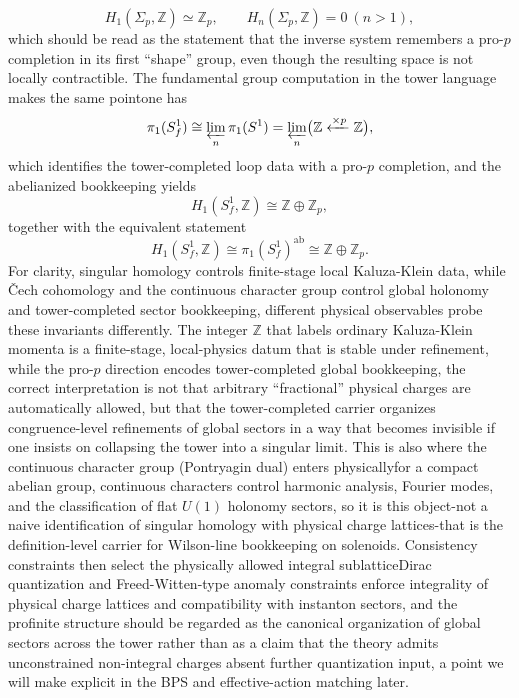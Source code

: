 \documentclass[11pt]{article}
\theoremstyle{remark}
\newcommand{\Z}{\mathbb{Z}}
\begin{document}
\begin{equation}\label{24}
H_1(\Sigma_p,\Z)\simeq \Z_p,\qquad H_n(\Sigma_p,\Z)=0\ (n>1),
\end{equation}
which should be read as the statement that the inverse system remembers a pro-\(p\) completion in its first ``shape'' group, even though the resulting space is not locally contractible. The fundamental group computation in the tower language makes the same point\:one has
\begin{equation}\label{28}
\pi_1(S_f^1)\cong \varprojlim_n \pi_1(S^1)=\varprojlim_n\bigl(\Z\xleftarrow{\times p}\Z\bigr),
\end{equation}
which identifies the tower-completed loop data with a pro-\(p\) completion, and the abelianized bookkeeping yields
\begin{equation}\label{29}
H_1(S_f^1,\Z)\cong \Z\oplus \Z_p,
\end{equation}
together with the equivalent statement
\begin{equation}\label{30}
H_1(S_f^1,\Z)\cong \pi_1(S_f^1)^{\mathrm{ab}}\cong \Z\oplus \Z_p.
\end{equation}
For clarity, singular homology controls finite-stage local Kaluza-Klein data, while \v{C}ech cohomology and the continuous character group control global holonomy and tower-completed sector bookkeeping, different physical observables probe these invariants differently.
The integer \(\Z\) that labels ordinary Kaluza-Klein momenta is a finite-stage, local-physics datum that is stable under refinement, while the pro-\(p\) direction encodes tower-completed global bookkeeping, the correct interpretation is not that arbitrary ``fractional'' physical charges are automatically allowed, but that the tower-completed carrier organizes congruence-level refinements of global sectors in a way that becomes invisible if one insists on collapsing the tower into a singular limit. This is also where the continuous character group (Pontryagin dual) enters physically\:for a compact abelian group, continuous characters control harmonic analysis, Fourier modes, and the classification of flat \(U(1)\) holonomy sectors, so it is this object-not a naive identification of singular homology with physical charge lattices-that is the definition-level carrier for Wilson-line bookkeeping on solenoids. Consistency constraints then select the physically allowed integral sublattice\:Dirac quantization and Freed-Witten-type anomaly constraints enforce integrality of physical charge lattices and compatibility with instanton sectors, and the profinite structure should be regarded as the canonical organization of global sectors across the tower rather than as a claim that the theory admits unconstrained non-integral charges absent further quantization input, a point we will make explicit in the BPS and effective-action matching later.
\end{document}
